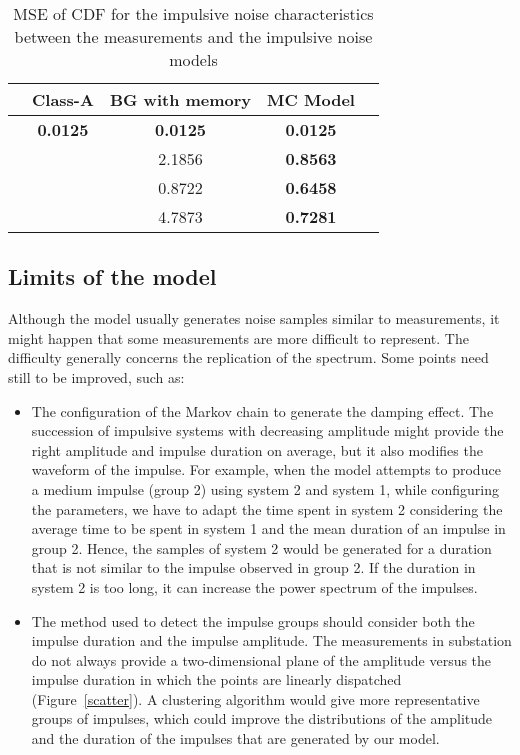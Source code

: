 \documentclass[journal]{IEEEtran}
\begin{document}
\begin{table}
  \centering
  \begin{tabular}{|c|c|c|c|c|}
   \hline
\centering{$-$} & Class-A & BG with memory & MC Model \\\hline
    \centering{Samples value} & \textbf{0.0125} & \textbf{0.0125} & \textbf{0.0125} \\\hline
    \centering{Impulse duration} & \centering{$-$}  & 2.1856 & \textbf{0.8563} \\\hline
    \centering{IAT} & \centering{$-$}  & 0.8722 & \textbf{0.6458} \\\hline
    \centering{Impulse amplitude} & \centering{$-$}  & 4.7873 & \textbf{0.7281} \\
    \hline
  \end{tabular}
  \caption{MSE of CDF for the impulsive noise characteristics between the measurements and the impulsive noise models}\label{MSE}
\end{table}

\subsection{Limits of the model}
Although the model usually generates noise samples similar to measurements, it might happen that some measurements are more difficult to represent. The difficulty generally concerns the replication of the spectrum. Some points need still to be improved, such as:\
\begin{itemize}
  \item The configuration of the Markov chain to generate the damping effect. The succession of impulsive systems with decreasing amplitude might provide the right amplitude and impulse duration on average, but it also modifies the waveform of the impulse. For example, when the model attempts to produce a medium impulse (group 2) using system 2 and system 1, while configuring the parameters, we have to adapt the time spent in system 2 considering the average time to be spent in system 1 and the mean duration of an impulse in group 2. Hence, the samples of system 2 would be generated for a duration that is not similar to the impulse observed in group 2. If the duration in system 2 is too long, it can increase the power spectrum of the impulses.
  \item The method used to detect the impulse groups should consider both the impulse duration and the impulse amplitude. The measurements in substation do not always provide a two-dimensional plane of the amplitude versus the impulse duration in which the points are linearly dispatched (Figure~\ref{scatter}). A clustering algorithm would give more representative groups of impulses, which could improve the distributions of the amplitude and the duration of the impulses that are generated by our model.
\end{itemize}
\end{document}
